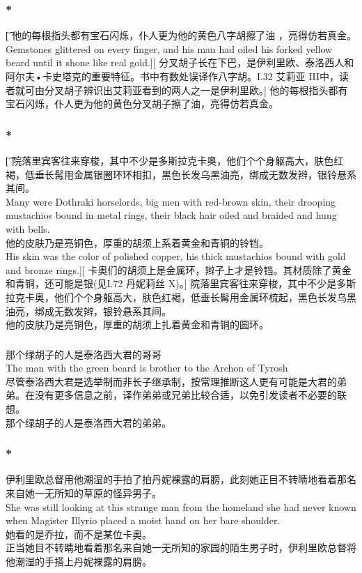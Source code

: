 \documentclass[12pt,a4paper]{article}
\newcommand{\h}[1]{{\color{red}#1}\\}
\newcommand{\la}[1]{{\color{blue}#1}\\}
\begin{document}
\subsubsection{\color{red}*}\t[	
	他的每根指头都有宝石闪烁，仆人更为他的黄色八字胡擦了油	，亮得仿若真金。\\
	Gemstones glittered on every finger, and his man had oiled his forked yellow beard until it shone like real gold.][
	分叉胡子长在下巴，是伊利里欧、泰洛西人和阿尔夫•卡史塔克的重要特征。书中有数处误译作八字胡。I.32 艾莉亚 III中，读者就可由分叉胡子辨识出艾莉亚看到的两人之一是伊利里欧。]
	他的每根指头都有宝石闪烁，仆人更为他的黄色分叉胡子擦了油，亮得仿若真金。

\subsubsection{\color{red}*}\t[
	院落里宾客往来穿梭，其中不少是多斯拉克卡奥，他们个个身躯高大，肤色红褐，低垂长髯用金属银圈环环相扣，黑色长发乌黑油亮，绑成无数发辫，银铃悬系其间。\\
	Many were Dothraki horselords, big men with red-brown skin, their drooping mustachios bound in metal rings, their black hair oiled and braided and hung with bells.\\
	他的皮肤乃是亮铜色，厚重的胡须上系着黄金和青铜的铃铛。\\
	His skin was the color of polished copper, his thick mustachios bound with gold and bronze rings.][
	卡奥们的胡须上是金属环，辫子上才是铃铛。其材质除了黄金和青铜，还可能是银(见I.72 丹妮莉丝 X)。]
	院落里宾客往来穿梭，其中不少是多斯拉克卡奥，他们个个身躯高大，肤色红褐，低垂长髯用金属环梳起，黑色长发乌黑油亮，绑成无数发辫，银铃悬系其间。\\
	他的皮肤乃是亮铜色，厚重的胡须上扎着黄金和青铜的圆环。
	
\subsubsection{}
		\la{那个绿胡子的人是泰洛西大君的哥哥\\
		The man with the green beard is brother to the Archon of Tyrosh}
\h{尽管泰洛西大君是选举制而非长子继承制，按常理推断这人更有可能是大君的弟弟。在没有更多信息之前，译作弟弟或兄弟比较合适，以免引发读者不必要的联想。}
		那个绿胡子的人是泰洛西大君的弟弟。
			
\subsubsection{\color{red}*}
	\la{	伊利里欧总督用他潮湿的手拍了拍丹妮裸露的肩膀，此刻她正目不转睛地看着那名来自她一无所知的草原的怪异男子。\\
		She was still looking at this strange man from the homeland she had never known when Magister Illyrio placed a moist hand on her bare shoulder.}
\h{		她看的是乔拉，而不是某位卡奥。}
		正当她目不转睛地看着那名来自她一无所知的家园的陌生男子时，伊利里欧总督将他潮湿的手搭上丹妮裸露的肩膀。
								
\end{document}

